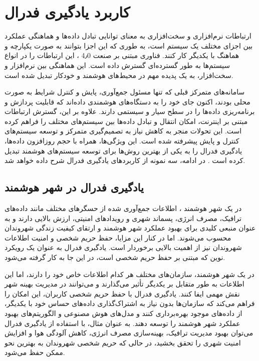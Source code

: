 \section{کاربرد یادگیری فدرال}
ارتباطات نرم‌افزاری و سخت‌افزاری به معنای توانایی تبادل داده‌ها و هماهنگی عملکرد بین اجزای مختلف یک سیستم است، به طوری که این اجزا بتوانند به صورت یکپارچه و هماهنگ با یکدیگر کار کنند. فناوری مبتنی بر صنعت 4٫0%
%
، این ارتباطات را در انواع سیستم‌ها به طور گسترده‌ای گسترش داده است. این هماهنگی بین نرم‌افزار و سخت‌افزار، به یک پدیده مهم در محیط‌های هوشمند و خودکار تبدیل شده است.

سامانه‌های متمرکز قبلی که تنها مسئول جمع‌آوری، پایش و کنترل شرایط به صورت محلی بودند، اکنون جای خود را به دستگاه‌های هوشمندی داده‌اند که قابلیت پردازش و برنامه‌ریزی داده‌ها را در سطح سیار و سیستمی دارند. علاوه بر این، گسترش ارتباطات مبتنی بر اینترنت، امکان انتقال و تبادل داده‌ها بین سیستم‌های مختلف را فراهم کرده است. این تحولات منجر به کاهش نیاز به تصمیم‌گیری متمرکز و توسعه سیستم‌های کنترل و پایش پیشرفته شده است. این ویژگی‌ها، همراه با حجم روزافزون داده‌ها، یادگیری فدرال را به یکی از بهترین روش‌ها برای توسعه سیستم‌های هوشمند تبدیل کرده است
\cite{mahtab2022algorithm}.
در ادامه، سه نمونه از کاربردهای یادگیری فدرال شرح داده خواهد شد.


\subsection{یادگیری فدرال در شهر هوشمند}
در یک شهر هوشمند%
%
، اطلاعات جمع‌آوری شده از حسگرهای مختلف مانند داده‌های ترافیک، مصرف انرژی، پسماند شهری و رویدادهای امنیتی، ارزش بالایی دارند و به عنوان منبعی کلیدی برای بهبود عملکرد شهر هوشمند و ارتقای کیفیت زندگی شهروندان محسوب می‌شوند. اما در کنار این مزایا، حفظ حریم شخصی و امنیت اطلاعات شهروندان نیز از اهمیت بالایی برخوردار است. یادگیری فدرال به عنوان یک رویکرد نوین که مبتنی بر حفظ حریم شخصی است، در این جا به کار گرفته می‌شود.

در یک شهر هوشمند، سازمان‌های مختلف هر کدام اطلاعات خاص خود را دارند، اما این اطلاعات به طور متقابل بر یکدیگر تأثیر می‌گذارند و می‌توانند در مدیریت بهینه شهر نقش مهمی ایفا کنند. یادگیری فدرال با حفظ حریم شخصی کاربران، این امکان را فراهم می‌کند که سازمان‌ها بدون نیاز به اشتراک‌گذاری داده‌های حساس خود با یکدیگر، از داده‌های موجود بهره‌برداری کنند و مدل‌های هوش مصنوعی و الگوریتم‌های بهبود عملکرد شهر هوشمند را توسعه دهند. به عنوان مثال، با استفاده از یادگیری فدرال می‌توان بهبود مدیریت ترافیک، بهینه‌سازی مصرف انرژی، کاهش آلودگی هوا و افزایش امنیت شهری را تحقق بخشید، در حالی که حریم شخصی شهروندان به بهترین نحو ممکن حفظ می‌شود.



